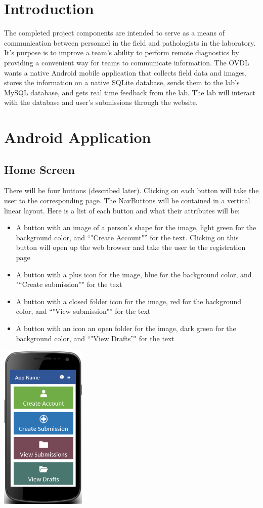 \documentclass[onecolumn, draftclsnofoot, article, 10pt, compsoc]{IEEEtran}
\begin{document}
\section{Introduction}
The completed project components are intended to serve as a means of communication between personnel in the field and pathologists in the laboratory. It's purpose is to improve a team's ability to perform remote diagnostics by providing a convenient way for teams to communicate information. The OVDL wants a native Android mobile application that collects field data and images, stores the information on a native SQLite database, sends them to the lab's MySQL database, and gets real time feedback from the lab. The lab will interact with the database and user's submissions through the website. 

\section{Android Application}
\subsection{Home Screen}
There will be four buttons (described later). Clicking on each button will take the user to the corresponding page. The NavButtons will be contained in a vertical linear layout. Here is a list of each button and what their attributes will be:
\begin{itemize}
\item A button with an image of a person’s shape for the image, light green for the background color, and “"Create Account"” for the text. Clicking on this button will open up the web browser and take the user to the registration page
\item A button with a plus icon for the image, blue for the background color, and "“Create submission”" for the text
\item A button with a closed folder icon for the image, red for the background color, and “"View submission"” for the text
\item A button with an icon an open folder for the image, dark green for the background color, and “"View Drafts”" for the text
\end{itemize}

\begin{center}
\includegraphics[height=8cm]{homescreen.png}
\end{center}
\end{document}
